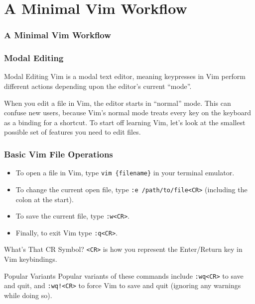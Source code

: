 \documentclass{beamer}
\begin{document}
\section{A Minimal Vim Workflow}

\begin{frame}[fragile]
    \frametitle{A Minimal Vim Workflow}
    \tableofcontents[currentsection]
\end{frame}

\begin{frame}[fragile]
    \frametitle{Modal Editing}
    \small
    \begin{block}{Modal Editing}
	Vim is a modal text editor, meaning keypresses in Vim perform different actions depending upon the editor's current \enquote{mode}.\\
    \end{block}
    When you edit a file in Vim, the editor starts in \enquote{normal} mode. This can confuse new users, because Vim's normal mode treats every key on the keyboard as a binding for a shortcut. To start off learning Vim, let's look at the smallest possible set of features you need to edit files.
\end{frame}

\begin{frame}[fragile]
    \frametitle{Basic Vim File Operations}
    \small
    \begin{itemize}
	\item To open a file in Vim, type \verb+vim {filename}+ in your terminal emulator.
	\item To change the current open file, type \verb+:e /path/to/file<CR>+ (including the colon at the start).
	\item To save the current file, type \verb+:w<CR>+.
	\item Finally, to exit Vim type \verb+:q<CR>+.
    \end{itemize}
    \begin{block}{What's That CR Symbol?}
	\verb+<CR>+ is how you represent the Enter/Return key in Vim keybindings.
    \end{block}
    \begin{block}{Popular Variants}
	Popular variants of these commands include \verb+:wq<CR>+ to save and quit, and \verb+:wq!<CR>+ to force Vim to save and quit (ignoring any warnings while doing so).
    \end{block}
\end{frame}
\end{document}
